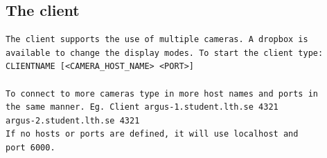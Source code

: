 \documentclass[8pt,titlepage]{article}
\begin{document}
\subsection{The client}
\begin{verbatim}
The client supports the use of multiple cameras. A dropbox is 
available to change the display modes. To start the client type:
CLIENTNAME [<CAMERA_HOST_NAME> <PORT>]

To connect to more cameras type in more host names and ports in 
the same manner. Eg. Client argus-1.student.lth.se 4321 
argus-2.student.lth.se 4321
If no hosts or ports are defined, it will use localhost and 
port 6000.
\end{verbatim}
\end{document}
